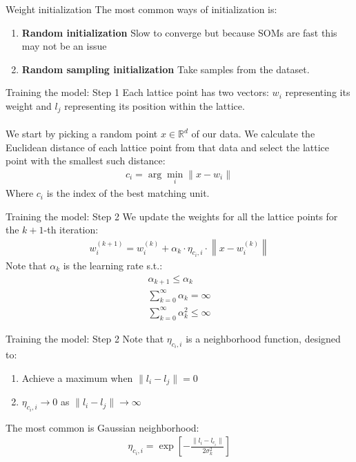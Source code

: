 \documentclass{beamer}
\begin{document}
\begin{frame}{Weight initialization}
	The most common ways of initialization is:
	\begin{enumerate}
		\item \textbf{Random initialization} Slow to converge but because SOMs are fast this may not be an issue
		\item \textbf{Random sampling initialization} Take samples from the dataset.
	\end{enumerate}
	
\end{frame}
\begin{frame}{Training the model: Step 1}
	Each lattice point has two vectors: $w_i$ representing its weight and $l_j$ representing its position within the lattice.  \\~\\
	We start by picking a random point $x \in \mathbb{R}^d$ of our data. We calculate the Euclidean distance of each lattice point from that data and select the lattice point with the smallest such distance:
	\begin{align}
		c_i = \arg \min_i \| x-w_i \|
	\end{align}
	Where $c_i$ is the index of the best matching unit. 
\end{frame}
\begin{frame}{Training the model: Step 2}
	We update the weights for all the lattice points for the $k+1$-th iteration:
	\begin{align}
		w^{(k+1)}_i = w_i^{(k)} + \alpha_k\cdot \eta_{c_i,i} \cdot \left\| x-w_i^{(k)} \right\|
	\end{align}
	Note that $\alpha_k$ is the learning rate s.t.:
	\begin{align}
		\alpha_{k+1} \leq \alpha_k \\
		\sum^\infty_{k=0} \alpha_k = \infty \\
		\sum^\infty_{k=0} \alpha_k^2 \leq \infty
	\end{align}	
\end{frame}
\begin{frame}{Training the model: Step 2}
	Note that $\eta_{c_i,i}$ is a neighborhood function, designed to: 
	\begin{enumerate}
		\item Achieve a maximum when $\|l_i-l_j \| =0$
		\item $\eta_{c_i,i} \rightarrow 0$ as $\| l_i-l_j\| \rightarrow \infty$
	\end{enumerate}
	
	
	The most common is Gaussian neighborhood:
	\begin{align}
		\eta_{c_i,i} = \exp \left[ -\frac{\|l_i - l_{c_i}\|}{2\sigma_k^2}\right]
	\end{align}
\end{frame}
\end{document}
